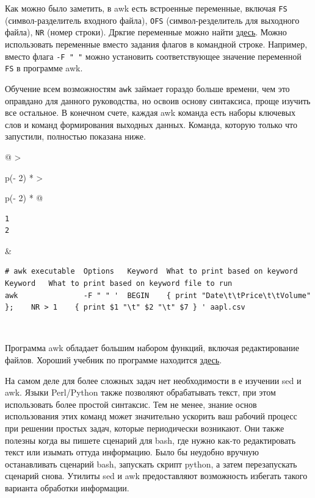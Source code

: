 \documentclass{article}
\begin{document}
Как можно было заметить, в awk есть встроенные переменные, включая
\texttt{FS} (символ-разделитель входного файла), \texttt{OFS}
(символ-резделитель для выходного файла), \texttt{NR} (номер строки).
Дркгие переменные можно найти
\href{https://www.tutorialspoint.com/awk/awk_built_in_variables.htm}{здесь}.
Можно использовать переменные вместо задания флагов в командной строке.
Например, вместо флага \texttt{-F\ "\ "} можно установить
соответствующее значение переменной \texttt{FS} в программе awk.

Обучение всем возможностям \texttt{awk} займает гораздо больше времени,
чем это оправдано для данного руководства, но освоив основу синтаксиса,
проще изучить все остальное. В конечном счете, каждая awk команда есть
наборы ключевых слов и команд формирования выходных данных. Команда,
которую только что запустили, полностью показана ниже.

\begin{longtable}[]{@{}
  >{\raggedright\arraybackslash}p{(\columnwidth - 2\tabcolsep) * }
  >{\raggedright\arraybackslash}p{(\columnwidth - 2\tabcolsep) * }@{}}
\toprule
\endhead
\begin{minipage}[t]{\linewidth}\raggedright
\begin{verbatim}
1
2
\end{verbatim}
\end{minipage} & \begin{minipage}[t]{\linewidth}\raggedright
\begin{verbatim}
# awk executable  Options   Keyword  What to print based on keyword          Keyword   What to print based on keyword file to run
awk               -F " " '  BEGIN    { print "Date\t\tPrice\t\tVolume" };    NR > 1    { print $1 "\t" $2 "\t" $7 } ' aapl.csv
\end{verbatim}
\end{minipage} \\ \addlinespace
\bottomrule
\end{longtable}

Программа awk обладает большим набором функций, включая редактирование
файлов. Хороший учебник по программе находится
\href{https://likegeeks.com/awk-command/}{здесь}.

На самом деле для более сложных задач нет необходимости в е изучении sed
и awk. Языки Perl/Python также позволяют обрабатывать текст, при этом
использовать более простой синтаксис. Тем не менее, знание основ
использования этих команд может значительно ускорить ваш рабочий процесс
при решении простых задач, которые периодически возникают. Они также
полезны когда вы пишете сценарий для bash, где нужно как-то
редактировать текст или изымать оттуда информацию. Было бы неудобно
вручную останавливать сценарий bash, запускать скрипт python, а затем
перезапускать сценарий снова. Утилиты sed и awk предоставляют
возможность избегать такого варианта обработки информации.
\end{document}
